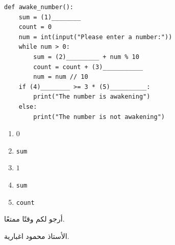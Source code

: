\documentclass[14pt]{extarticle}
\begin{document}
\begin{enumerate}[resume, label=\textbf{السؤال \arabic*:}, wide=0pt, itemsep=2.2em]
\begin{enumerate}[label=\alph*.]
\begin{boxCode}
\begin{english}
\begin{verbatim}
def awake_number():
    sum = (1)________
    count = 0
    num = int(input("Please enter a number:"))
    while num > 0:
        sum = (2)_________ + num % 10
        count = count + (3)___________
        num = num // 10
    if (4)________ >= 3 * (5)__________:
        print("The number is awakening")
    else:
        print("The number is not awakening")
\end{verbatim}
\end{english}
\end{boxCode}

\ifwithsols
\begin{boxSolution}
\begin{enumerate}[label=(\arabic*)]
\item $0$
\item \textenglish{\texttt{sum}}
\item $1$
\item \textenglish{\texttt{sum}}
\item \textenglish{\texttt{count}}
\end{enumerate}
\end{boxSolution}
\fi
\filbreak
\end{enumerate}
\filbreak

\end{enumerate}

\vspace{1cm}
\begin{flushleft}
أرجو لكم وقتًا ممتعًا.

الأستاذ محمود اغبارية.
\end{flushleft}
\end{document}
